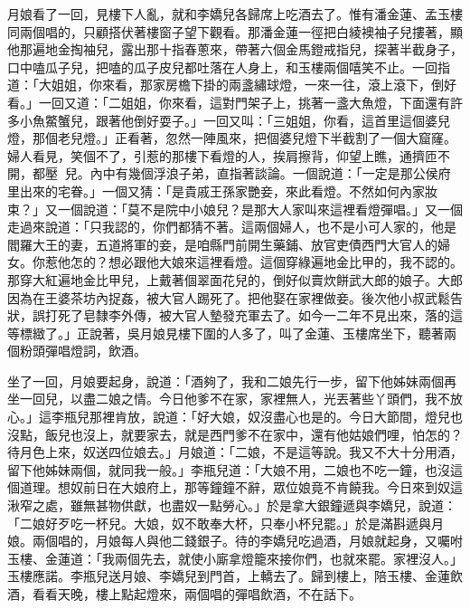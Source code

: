 月娘看了一回，見樓下人亂，就和李嬌兒各歸席上吃酒去了。惟有潘金蓮、孟玉樓同兩個唱的，只顧搭伏著樓窗子望下觀看。那潘金蓮一徑把白綾襖袖子兒摟著，顯他那遍地金掏袖兒，露出那十指春蔥來，帶著六個金馬鐙戒指兒，探著半截身子，口中嗑瓜子兒，把嗑的瓜子皮兒都吐落在人身上，和玉樓兩個嘻笑不止。一回指道：「大姐姐，你來看，那家房檐下掛的兩盞繡球燈，一來一往，滾上滾下，倒好看。」一回又道：「二姐姐，你來看，這對門架子上，挑著一盞大魚燈，下面還有許多小魚鱉蟹兒，跟著他倒好耍子。」一回又叫：「三姐姐，你看，這首里這個婆兒燈，那個老兒燈。」正看著，忽然一陣風來，把個婆兒燈下半截割了一個大窟窿。婦人看見，笑個不了，引惹的那樓下看燈的人，挨肩擦背，仰望上瞧，通擠匝不開，都壓𨇽𨇽兒。內中有幾個浮浪子弟，直指著談論。一個說道：「一定是那公侯府里出來的宅眷。」一個又猜：「是貴戚王孫家艷妾，來此看燈。不然如何內家妝束？」又一個說道：「莫不是院中小娘兒？是那大人家叫來這裡看燈彈唱。」又一個走過來說道：「只我認的，你們都猜不著。這兩個婦人，也不是小可人家的，他是閻羅大王的妻，五道將軍的妾，是咱縣門前開生藥鋪、放官吏債西門大官人的婦女。你惹他怎的？想必跟他大娘來這裡看燈。這個穿綠遍地金比甲的，我不認的。那穿大紅遍地金比甲兒，上戴著個翠面花兒的，倒好似賣炊餅武大郎的娘子。大郎因為在王婆茶坊內捉姦，被大官人踢死了。把他娶在家裡做妾。後次他小叔武鬆告狀，誤打死了皂隸李外傳，被大官人墊發充軍去了。如今一二年不見出來，落的這等標緻了。」正說著，吳月娘見樓下圍的人多了，叫了金蓮、玉樓席坐下，聽著兩個粉頭彈唱燈詞，飲酒。

坐了一回，月娘要起身，說道：「酒夠了，我和二娘先行一步，留下他姊妹兩個再坐一回兒，以盡二娘之情。今日他爹不在家，家裡無人，光丟著些丫頭們，我不放心。」這李瓶兒那裡肯放，說道：「好大娘，奴沒盡心也是的。今日大節間，燈兒也沒點，飯兒也沒上，就要家去，就是西門爹不在家中，還有他姑娘們哩，怕怎的？待月色上來，奴送四位娘去。」月娘道：「二娘，不是這等說。我又不大十分用酒，留下他姊妹兩個，就同我一般。」李瓶兒道：「大娘不用，二娘也不吃一鐘，也沒這個道理。想奴前日在大娘府上，那等鐘鐘不辭，眾位娘竟不肯饒我。今日來到奴這湫窄之處，雖無甚物供獻，也盡奴一點勞心。」於是拿大銀鐘遞與李嬌兒，說道：「二娘好歹吃一杯兒。大娘，奴不敢奉大杯，只奉小杯兒罷。」於是滿斟遞與月娘。兩個唱的，月娘每人與他二錢銀子。待的李嬌兒吃過酒，月娘就起身，又囑咐玉樓、金蓮道：「我兩個先去，就使小廝拿燈籠來接你們，也就來罷。家裡沒人。」玉樓應諾。李瓶兒送月娘、李嬌兒到門首，上轎去了。歸到樓上，陪玉樓、金蓮飲酒，看看天晚，樓上點起燈來，兩個唱的彈唱飲酒，不在話下。

